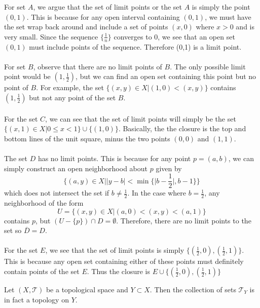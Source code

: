 \documentclass[a4paper,12pt,twoside]{hmcpset}
\begin{document}
\begin{solution}
For set $A$, we argue that the set of limit points or the set $A$ is
simply the point $(0, 1)$. This is because for any open interval
containing $(0, 1)$, we must have the set wrap back around and include
a set of points $(x, 0)$ where $x > 0$ and is very small. Since the
sequence $\{\frac{1}{n}\}$ converges to 0, we see that an open set
$(0, 1)$ must include points of the sequence. Therefore (0,1) is a
limit point. \\
\\
For set $B$, observe that there are no limit points of $B$. The only
possible limit point would be $(1, \frac{1}{2})$, but we can find an
open set containing this point but no point of $B$. For example, the
set $\{(x,y) \in X | (1, 0) < (x, y)\}$ contains $(1, \frac{1}{2})$
but not any point of the set $B$. \\
\\
For the set $C$, we can see that the set of limit points will simply
be the set $\{(x, 1) \in X | 0 \le x < 1\} \cup \{(1, 0)\}$.
Basically, the the closure is the top and bottom lines of the unit
square, minus the two points $(0,0)$ and $(1,1 )$. \\
\\
The set $D$ has no limit points. This is because for any point $p =
(a, b)$, we can simply construct an open neighborhood about $p$ given
by 
$$\{(a,y) \in X | |y - b| < \min\{|b - \frac{1}{2}|, b - 1\} \}$$
which does not intersect the set if $b \ne \frac{1}{2}.$ In the case
where $b = \frac{1}{2}$, any neighborhood of the form 
$$U = \{(x, y) \in X | (a, 0) < (x, y) < (a, 1)\}$$ contains $p$, but
$(U - \{p\})\cap D = \emptyset.$ Therefore, there are no limit points
to the set so $\overline{D} = D$. \\
\\
For the set $E$, we see that the set of limit points is simply
$\{(\frac{1}{2}, 0), (\frac{1}{2}, 1)\}$. This is because any open set
containing either of these points must definitely contain points of
the set $E$. Thus the closure is $E \cup \{(\frac{1}{2}, 0),
(\frac{1}{2}, 1)\}$
\end{solution}


\begin{problem}[Theorem 4.25] Let $(X, \mathscr{T})$ be a topological
    space and $Y \subset X$. Then the collection of sets
    $\mathscr{T}_Y$ is in fact a topology on $Y$.
\end{problem}
\end{document}
